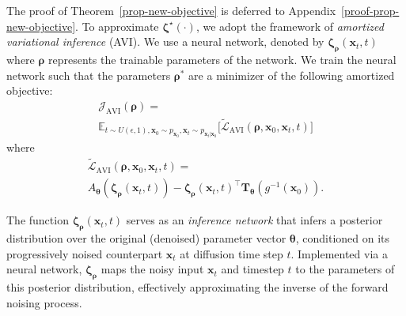 The proof of Theorem~\ref{prop-new-objective} is deferred to Appendix~\ref{proof-prop-new-objective}. 
To approximate $\boldsymbol{\zeta}^{\star}(\cdot)$, we adopt the framework of \textit{amortized variational inference} (AVI).
We use a neural network, denoted by $\boldsymbol{\zeta}_{\boldsymbol{\rho}}(\mathbf{x}_t, t)$ where $\boldsymbol{\rho}$ represents the trainable parameters of the network. We train the neural network such that the parameters $\boldsymbol{\rho}^{*}$ are a minimizer of the following amortized objective:
\begin{multline*}
\mathcal{J}_{\text{AVI}}(\boldsymbol{\rho}) = \\ \mathbb{E}_{t\sim U(\epsilon, 1), \mathbf{x}_0\sim  p_{\mathbf{x}_0},\mathbf{x}_t \sim p_{\mathbf{x}_t|\mathbf{x}_0}}\Big[ \tilde{\mathcal{L}}_{\text{AVI}}(\boldsymbol{\rho},\mathbf{x}_0,\mathbf{x}_t, t)\Big]
\end{multline*}
where
\begin{multline*}
\tilde{\mathcal{L}}_{\text{AVI}}(\boldsymbol{\rho},\mathbf{x}_0,\mathbf{x}_t, t) =  \\  A_{\boldsymbol{\theta}}(\boldsymbol{\zeta}_{\boldsymbol{\rho}}(\mathbf{x}_t, t))  -\boldsymbol{\zeta}_{\boldsymbol{\rho}}(\mathbf{x}_t, t)^{\top}\mathbf{T}_{\boldsymbol{\theta}}(g^{-1}(\mathbf{x}_{0})).
\end{multline*}
\begin{remark}
The function $\boldsymbol{\zeta}_{\boldsymbol{\rho}}(\mathbf{x}_t,t)$ serves as an \textit{inference network} that infers a posterior distribution over the original (denoised) parameter vector $\boldsymbol{\theta}$, conditioned on its progressively noised counterpart 
$\mathbf{x}_t$ at diffusion time step $t$. Implemented via a neural network, $\boldsymbol{\zeta}_{\boldsymbol{\rho}}$  maps the noisy input $\mathbf{x}_t$ and timestep $t$ to the parameters of this posterior distribution, effectively approximating the inverse of the forward noising process.
\end{remark}





